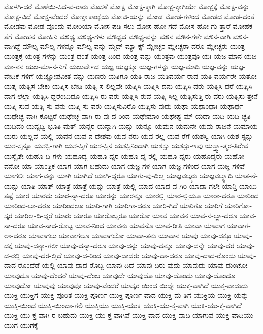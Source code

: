 {ಮೊಳಗಿ-ದರೆ
ಮೊಳೆಯಿ-ಸಿದ-ವ-ರಾರು
ಮೊಸಳೆ
ಮೋಕ್ಷ
ಮೋಕ್ಷ-ಕ್ಕಾಗಿ
ಮೋಕ್ಷ-ಕ್ಕಾಗಿಯೇ
ಮೋಕ್ಷಕ್ಕೆ
ಮೋಕ್ಷ-ವನ್ನು
ಮೋಕ್ಷ-ವಿದೆ
ಮೋಕ್ಷ-ವೆಂದರೆ
ಮೋಕ್ಷಾಕಾಂಕ್ಖೆಯ
ಮೋಚಿ-ಯನ್ನು
ಮೋಡ
ಮೋಡ-ಗಳಿಂದ
ಮೋಡದ
ಮೋಡ-ದಂತೆ
ಮೋಡವು
ಮೋಡ-ವೊಂದು
ಮೋರಿಯಾ
ಮೋಸ-ಪಡಿ-ಸಲು
ಮೋಸ-ಹೋ-ಗದೆ
ಮೋಸ-ಹೋ-ಗು-ತ್ತಾರೆ
ಮೋಹಕ-ತೆಗೆ
ಮೋಹನ
ಮೋಹಿನಿ
ಮೌಢ್ಯ
ಮೌಢ್ಯ-ಗಳು
ಮೌಢ್ಯದ
ಮೌಢ್ಯ-ವನ್ನು
ಮೌನ
ಮೌನ-ಗಳೇ
ಮೌನ-ವಾಗಿ
ಮೌನ-ವಾಗಿದ್ದೆ
ಮೌಲ್ಯ
ಮೌಲ್ಯ-ಗಳನ್ನೂ
ಮೌಲ್ಯ-ವನ್ನು
ಮ್ಮದ್
ಮ್ಯಾ-ಕ್ಸ್
ಮ್ಲೇಚ್ಛರ
ಮ್ಲೇಚ್ಛರಾ-ದರೂ
ಮ್ಲೇಚ್ಛರು
ಯಂತ್ರ
ಯಂತ್ರಕ್ಕೆ
ಯಂತ್ರ-ಗಳನ್ನು
ಯಂತ್ರ-ದಂತೆ
ಯಂತ್ರ-ದಿಂದ
ಯಂತ್ರ-ವನ್ನು
ಯಂತ್ರವು
ಯಂತ್ರವೂ
ಯಃ
ಯಜ-ಮಾನ
ಯಜ-ಮಾ-ನನ
ಯಜ-ಮಾ-ನ-ನಿಗೆ
ಯಜುರ್ವೇದ
ಯಜ್ಞ
ಯಜ್ಞಕ್ಕೂ
ಯಜ್ಞ-ಗಳನ್ನು
ಯಜ್ಞ-ಮಾಡಿ
ಯಜ್ಞ-ವನ್ನು
ಯಜ್ಞ-ವೇದಿಕೆ-ಗಳಿಗೆ
ಯಜ್ಞೋಪವೀತ-ವನ್ನು
ಯಣರು
ಯತಿಗೂ
ಯತಿ-ರಾಜ
ಯತಿವರ್ಯ-ರಾದ
ಯತಿ-ವರ್ಯರೇ
ಯತೋ
ಯತ್ನ
ಯತ್ನಿಸ-ಬೇಕು
ಯತ್ನಿಸ-ಬೇಡಿ
ಯತ್ನಿ-ಸ-ಲಿಲ್ಲವೇ
ಯತ್ನಿಸಿ
ಯತ್ನಿಸಿ-ದನು
ಯತ್ನಿಸಿ-ದರು
ಯತ್ನಿಸಿ-ದರೆ
ಯತ್ನಿಸಿ-ದಾಗ-ಲೆಲ್ಲಾ
ಯತ್ನಿಸಿ-ದ್ದರೆಂಬುದೂ
ಯತ್ನಿಸಿ-ರು-ವರು
ಯತ್ನಿಸಿ-ರುವೆ
ಯತ್ನಿ-ಸಿಲ್ಲ
ಯತ್ನಿಸುತ್ತಿ-ರು-ವರು
ಯತ್ನಿಸು-ತ್ತೇನೆ
ಯತ್ನಿ-ಸುವ
ಯತ್ನಿ-ಸು-ವನು
ಯತ್ನಿ-ಸು-ವರು
ಯತ್ನಿಸುವಿರೊ
ಯತ್ನಿಸು-ವುದು
ಯಥಾ
ಯಥಾಂಧಾಃ
ಯಥಾರ್ಥ
ಯಥೇಚ್ಛ-ವಾಗಿ-ಕೊಟ್ಟರೆ
ಯಥೇಚ್ಛ-ವಾಗಿ-ರು-ವು-ದ-ರಿಂದ
ಯಥೇಮಾಂ
ಯಥೇಷ್ಟ-ಮ್
ಯದಾ
ಯದಿ
ಯದಿ-ಚ್ಛತಿ
ಯದಿದಂ
ಯದ್ಯದ್ವಿ-ಭೂತಿ-ಮತ್
ಯನ್ನರ
ಯನ್ನಾಗಿ
ಯನ್ನು
ಯನ್ನೂ
ಯಮನ
ಯಮನೇ
ಯಮ-ರಾಜನೆ
ಯಮಾಯ
ಯರು
ಯಲ್ಲವೆ
ಯಲ್ಲಿ
ಯವನ
ಯವ-ನ-ದೇಶವು
ಯವ-ನರು
ಯವ-ರಲ್ಲ
ಯವ-ರೆಗೆ
ಯಶಸ್ವಿ-ಯಾಗಿ
ಯಶ-ಸ್ಸನ್ನು
ಯಶ-ಸ್ಸನ್ನೂ
ಯಶಸ್ಸಿ-ಗಾಗಿ
ಯಶ-ಸ್ಸಿಗೆ
ಯಶ-ಸ್ಸಿನ
ಯಶಸ್ಸಿನಿಂದಾಗಿ
ಯಶಸ್ಸು
ಯಶಸ್ಸು-ಇವು
ಯಸ್ತ್ವಾ-ತ್ಮರ-ತಿರೇವ
ಯಸ್ಯೈತೇ
ಯಹೂ-ದಿ-ಗಳು
ಯಹೂದ್ಯ
ಯಹೂ-ದ್ಯರ
ಯಹೂ-ದ್ಯ-ರಲ್ಲಿ
ಯಹೂ-ದ್ಯರು
ಯಹೊದ್ಯರು
ಯಹೋ-ವನೋ
ಯಾ
ಯಾಂತ್ರಿಕ
ಯಾಗ
ಯಾಗ-ಬಹುದು
ಯಾಗ-ಯಜ್ಞ-ಗಳ
ಯಾಗ-ಯಜ್ಞ-ಗಳಿಂದ
ಯಾಗ-ಯಜ್ಞ-ಗಳಿವೆ
ಯಾಗಲೀ
ಯಾಗ-ವನ್ನು
ಯಾಗಿ
ಯಾಗಿದೆ
ಯಾಗಿ-ದ್ದರೂ
ಯಾಗು-ವು-ದಿಲ್ಲ
ಯಾಜ್ಞವಲ್ಕ್ಯರು
ಯಾಜ್ಞವಲ್ಕ್ಯಾದಿ
ಯಾತ-ನೆ-ಯನ್ನು
ಯಾತಿ
ಯಾತ್
ಯಾತ್ರೆ
ಯಾತ್ರೆ-ಯನ್ನು
ಯಾತ್ರೆ-ಯಲ್ಲಿ
ಯಾದ
ಯಾದ-ವ-ಗಿರಿ
ಯಾದಾ-ಗಲೇ
ಯಾನ್ತಿ
ಯಾಯಿ-ತಷ್ಟೆ
ಯಾರ
ಯಾರದು
ಯಾರ-ನ್ನಾ-ದರೂ
ಯಾರನ್ನು
ಯಾರನ್ನೂ
ಯಾರಲ್ಲಿ
ಯಾರ-ಲ್ಲಿಯೂ
ಯಾರಾ-ದರೂ
ಯಾರಿಂದ
ಯಾರಿಂದ-ಲಾ-ದರೂ
ಯಾರಿಂದಲೂ
ಯಾರಿ-ಗಾಗಿ
ಯಾರಿಗಾ-ದರೂ
ಯಾರಿ-ಗಿದೆ
ಯಾರಿಗೂ
ಯಾರಿಗೆ
ಯಾರಿಗೋ-ಸ್ಕರ
ಯಾರಿಲ್ಲ-ದಿ-ದ್ದರೆ
ಯಾರು
ಯಾರೂ
ಯಾರೊಬ್ಬರೂ
ಯಾರೋ
ಯಾವ
ಯಾವನ
ಯಾವ-ನ-ಲ್ಲಾ-ದರೂ
ಯಾವ-ನಾ-ದರೂ
ಯಾವ-ನಾದ-ರೊಬ್ಬ
ಯಾವ-ನಿಂದ
ಯಾವನು
ಯಾವನೊ
ಯಾವ-ರೀತಿ
ಯಾವಾ
ಯಾವಾಗ
ಯಾವಾಗ-ಲಾ-ದರೂ
ಯಾವಾಗಲು
ಯಾವಾಗಲೂ
ಯಾವಾಗಲೋ
ಯಾವಾ-ತನು
ಯಾವಾನ
ಯಾವು
ಯಾವು-ದಕ್ಕೂ
ಯಾವು-ದಕ್ಕೆ
ಯಾವು-ದನ್ನಾ-ಗಲೀ
ಯಾವು-ದನ್ನಾ-ದರೂ
ಯಾವು-ದನ್ನು
ಯಾವು-ದನ್ನೂ
ಯಾವು-ದನ್ನೇ
ಯಾವು-ದರ
ಯಾವು-ದ-ರಲ್ಲಿ
ಯಾವು-ದರ-ಲ್ಲಿದೆ
ಯಾವು-ದ-ರಿಂದ
ಯಾವು-ದಾದರು
ಯಾವು-ದಾ-ದರೂ
ಯಾವು-ದಾದ-ರೊಂದು
ಯಾವು-ದಾದ-ರೊಂದೆಡೆ-ಯಲ್ಲಿ
ಯಾವು-ದಾದ-ರೊಬ್ಬ
ಯಾವು-ದಿದೆ
ಯಾವು-ದಿರು-ವುದು
ಯಾವುದು
ಯಾವು-ದುಂಟೋ
ಯಾವುದೂ
ಯಾವು-ದೆಂದರೆ
ಯಾವು-ದೆಂಬ
ಯಾವುದೇ
ಯಾವುದೊ
ಯಾವು-ದೊಂದು
ಯಾವು-ದೊಂದೂ
ಯಾವುದೋ
ಯಾವುವು
ಯಾವುವೂ
ಯಾವು-ವೆಂದರೆ
ಯಾಸ್ಕರ
ಯಿಂದ
ಯಿದ್ದೇ
ಯುಕ್ತ-ವಾಗಿದೆ
ಯುಕ್ತ-ವಾದುದು
ಯುಕ್ತಿ
ಯುಕ್ತಿಗೆ
ಯುಕ್ತಿ-ಪೂರಿತ
ಯುಕ್ತಿ-ಪೂರ್ಣ
ಯುಕ್ತಿ-ಪೂರ್ಣ-ವಾದ
ಯುಕ್ತಿ-ಮ-ತಿಗೆ
ಯುಕ್ತಿಯ
ಯುಕ್ತಿ-ಯನ್ನು
ಯುಕ್ತಿ-ಯಿಂದ
ಯುಕ್ತಿ-ಯಿಂದಾ-ಗಲಿ
ಯುಕ್ತಿಯು
ಯುಕ್ತಿ-ಯುಕ್ತ
ಯುಕ್ತಿ-ಯು-ಕ್ತ-ವಾಗಿ
ಯುಕ್ತಿ-ಯು-ಕ್ತ-ವಾಗಿದೆ
ಯುಕ್ತಿ-ಯು-ಕ್ತ-ವಾಗಿ-ರ-ಬಹುದು
ಯುಕ್ತಿ-ಯು-ಕ್ತ-ವಾಗಿವೆ
ಯುಕ್ತಿ-ವಾದ
ಯುಕ್ತಿ-ವಾದಿ-ಯಾಗುವ
ಯುಕ್ತಿ-ವಾದಿಯು
ಯುಗ
ಯುಗಕ್ಕೆ
}
